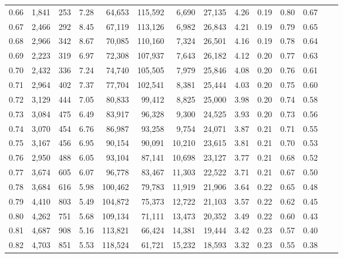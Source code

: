 \begin{tabular}{rrrrrrrrrrrrrr}
0.66 &  1,841 &    253 &    7.28 &   64,653 &  115,592 &   6,690 &  27,135 &  4.26 &  0.19 &  0.80 &      0.67 \\
0.67 &  2,466 &    292 &    8.45 &   67,119 &  113,126 &   6,982 &  26,843 &  4.21 &  0.19 &  0.79 &      0.65 \\
0.68 &  2,966 &    342 &    8.67 &   70,085 &  110,160 &   7,324 &  26,501 &  4.16 &  0.19 &  0.78 &      0.64 \\
0.69 &  2,223 &    319 &    6.97 &   72,308 &  107,937 &   7,643 &  26,182 &  4.12 &  0.20 &  0.77 &      0.63 \\
0.70 &  2,432 &    336 &    7.24 &   74,740 &  105,505 &   7,979 &  25,846 &  4.08 &  0.20 &  0.76 &      0.61 \\
0.71 &  2,964 &    402 &    7.37 &   77,704 &  102,541 &   8,381 &  25,444 &  4.03 &  0.20 &  0.75 &      0.60 \\
0.72 &  3,129 &    444 &    7.05 &   80,833 &   99,412 &   8,825 &  25,000 &  3.98 &  0.20 &  0.74 &      0.58 \\
0.73 &  3,084 &    475 &    6.49 &   83,917 &   96,328 &   9,300 &  24,525 &  3.93 &  0.20 &  0.73 &      0.56 \\
0.74 &  3,070 &    454 &    6.76 &   86,987 &   93,258 &   9,754 &  24,071 &  3.87 &  0.21 &  0.71 &      0.55 \\
0.75 &  3,167 &    456 &    6.95 &   90,154 &   90,091 &  10,210 &  23,615 &  3.81 &  0.21 &  0.70 &      0.53 \\
0.76 &  2,950 &    488 &    6.05 &   93,104 &   87,141 &  10,698 &  23,127 &  3.77 &  0.21 &  0.68 &      0.52 \\
0.77 &  3,674 &    605 &    6.07 &   96,778 &   83,467 &  11,303 &  22,522 &  3.71 &  0.21 &  0.67 &      0.50 \\
0.78 &  3,684 &    616 &    5.98 &  100,462 &   79,783 &  11,919 &  21,906 &  3.64 &  0.22 &  0.65 &      0.48 \\
0.79 &  4,410 &    803 &    5.49 &  104,872 &   75,373 &  12,722 &  21,103 &  3.57 &  0.22 &  0.62 &      0.45 \\
0.80 &  4,262 &    751 &    5.68 &  109,134 &   71,111 &  13,473 &  20,352 &  3.49 &  0.22 &  0.60 &      0.43 \\
0.81 &  4,687 &    908 &    5.16 &  113,821 &   66,424 &  14,381 &  19,444 &  3.42 &  0.23 &  0.57 &      0.40 \\
0.82 &  4,703 &    851 &    5.53 &  118,524 &   61,721 &  15,232 &  18,593 &  3.32 &  0.23 &  0.55 &      0.38 \\

\end{tabular}
